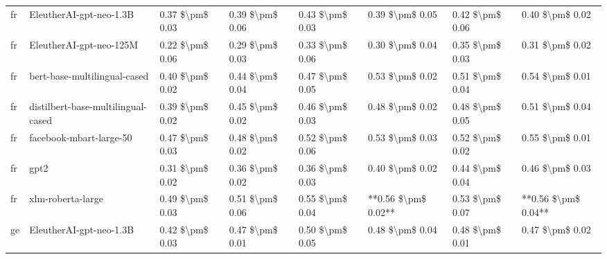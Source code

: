 \begin{tabular}{llllllll}
      fr &            EleutherAI-gpt-neo-1.3B & 0.37 \$\textbackslash pm\$ 0.03 &           0.39 \$\textbackslash pm\$ 0.06 &       0.43 \$\textbackslash pm\$ 0.03 &        0.39 \$\textbackslash pm\$ 0.05 &                         0.42 \$\textbackslash pm\$ 0.06 &     0.40 \$\textbackslash pm\$ 0.02 \\
      fr &            EleutherAI-gpt-neo-125M & 0.22 \$\textbackslash pm\$ 0.06 &           0.29 \$\textbackslash pm\$ 0.03 &       0.33 \$\textbackslash pm\$ 0.06 &        0.30 \$\textbackslash pm\$ 0.04 &                         0.35 \$\textbackslash pm\$ 0.03 &     0.31 \$\textbackslash pm\$ 0.02 \\
      fr &       bert-base-multilingual-cased & 0.40 \$\textbackslash pm\$ 0.02 &           0.44 \$\textbackslash pm\$ 0.04 &       0.47 \$\textbackslash pm\$ 0.05 &        0.53 \$\textbackslash pm\$ 0.02 &                         0.51 \$\textbackslash pm\$ 0.04 &     0.54 \$\textbackslash pm\$ 0.01 \\
      fr & distilbert-base-multilingual-cased & 0.39 \$\textbackslash pm\$ 0.02 &           0.45 \$\textbackslash pm\$ 0.02 &       0.46 \$\textbackslash pm\$ 0.03 &        0.48 \$\textbackslash pm\$ 0.02 &                         0.48 \$\textbackslash pm\$ 0.05 &     0.51 \$\textbackslash pm\$ 0.04 \\
      fr &            facebook-mbart-large-50 & 0.47 \$\textbackslash pm\$ 0.03 &           0.48 \$\textbackslash pm\$ 0.02 &       0.52 \$\textbackslash pm\$ 0.06 &        0.53 \$\textbackslash pm\$ 0.03 &                         0.52 \$\textbackslash pm\$ 0.02 &     0.55 \$\textbackslash pm\$ 0.01 \\
      fr &                               gpt2 & 0.31 \$\textbackslash pm\$ 0.02 &           0.36 \$\textbackslash pm\$ 0.02 &       0.36 \$\textbackslash pm\$ 0.03 &        0.40 \$\textbackslash pm\$ 0.02 &                         0.44 \$\textbackslash pm\$ 0.04 &     0.46 \$\textbackslash pm\$ 0.03 \\
      fr &                  xlm-roberta-large & 0.49 \$\textbackslash pm\$ 0.03 &           0.51 \$\textbackslash pm\$ 0.06 &       0.55 \$\textbackslash pm\$ 0.04 &    **0.56 \$\textbackslash pm\$ 0.02** &                         0.53 \$\textbackslash pm\$ 0.07 & **0.56 \$\textbackslash pm\$ 0.04** \\
      ge &            EleutherAI-gpt-neo-1.3B & 0.42 \$\textbackslash pm\$ 0.03 &           0.47 \$\textbackslash pm\$ 0.01 &       0.50 \$\textbackslash pm\$ 0.05 &        0.48 \$\textbackslash pm\$ 0.04 &                         0.48 \$\textbackslash pm\$ 0.01 &     0.47 \$\textbackslash pm\$ 0.02 \\

\end{tabular}
